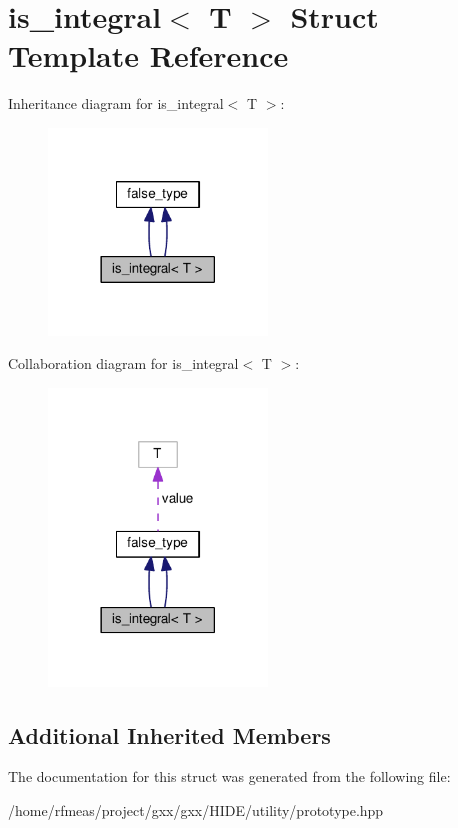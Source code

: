 \hypertarget{structis__integral}{}\section{is\+\_\+integral$<$ T $>$ Struct Template Reference}
\label{structis__integral}


Inheritance diagram for is\+\_\+integral$<$ T $>$\+:
\nopagebreak
\begin{figure}[H]
\begin{center}
\leavevmode
\includegraphics[width=165pt]{structis__integral__inherit__graph}
\end{center}
\end{figure}


Collaboration diagram for is\+\_\+integral$<$ T $>$\+:
\nopagebreak
\begin{figure}[H]
\begin{center}
\leavevmode
\includegraphics[width=165pt]{structis__integral__coll__graph}
\end{center}
\end{figure}
\subsection*{Additional Inherited Members}


The documentation for this struct was generated from the following file\+:\begin{DoxyCompactItemize}
\item 
/home/rfmeas/project/gxx/gxx/\+H\+I\+D\+E/utility/prototype.\+hpp\end{DoxyCompactItemize}
